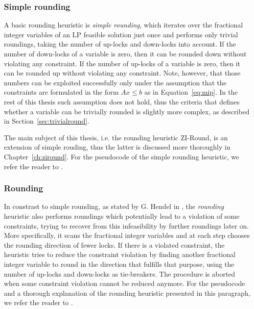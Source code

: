 \documentclass[a4paper,12pt,twoside]{scrbook}
\begin{document}
\subsubsection{Simple rounding}
A basic rounding heuristic is \textit{simple rounding}, which iterates over the fractional integer variables of an LP feasible solution just once and performs only trivial roundings, taking the number of up-locks and down-locks into account. If the number of down-locks of a variable is zero, then it can be rounded down without violating any constraint. If the number of up-locks of a variable is zero, then it can be rounded up without violating any constraint.
Note, however, that those numbers can be exploited successfully only under the assumption that the constraints are formulated in the form $Ax \leq b$ as in Equation~\ref{eq:mip}. In the rest of this thesis such assumption does not hold, thus the criteria that defines whether a variable can be trivially rounded is slightly more complex, as described in Section~\ref{sec:trivialround}. \par 
The main subject of this thesis, i.e. the rounding heuristic ZI-Round, is an extension of simple rouding, thus the latter is discussed more thoroughly in Chapter~\ref{ch:ziround}. For the pseudocode of the simple rounding heuristic, we refer the reader to \cite{berthold2006}. \par 
\subsubsection{Rounding}
In constrast to simple rounding, as stated by G. Hendel in \cite{hendel2011}, the \textit{rounding} heuristic also performs roundings which potentially lead to a violation of some constraints, trying to recover from this infeasibility by further roundings later on. More specifically, it scans the fractional integer variables and at each step chooses the rounding direction of fewer locks. If there is a violated constraint, the heuristic tries to reduce the constraint violation by finding another fractional integer variable to round in the direction that fulfills that purpose, using the number of up-locks and down-locks as tie-breakers. The procedure is aborted when some constraint violation cannot be reduced anymore. For the pseudocode and a thorough explanation of the rounding heuristic presented in this paragraph, we refer the reader to \cite{berthold2006}. \par
\end{document}
